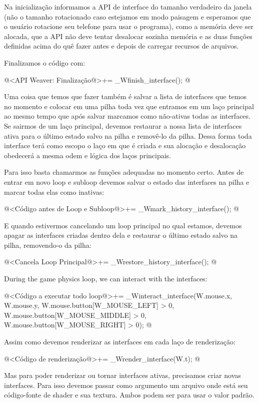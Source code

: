 Na inicialização informamos a API de interface do tamanho verdadeiro
da janela (não o tamanho rotacionado caso estejamos em modo paisagem e
esperamos que o usuário rotacione seu telefone para usar o programa),
como a memória deve ser alocada, que a API não deve tentar desalocar
sozinha memória e as duas funções definidas acima do quê fazer antes e
depois de carregar recursos de arquivos.

Finalizamos o código com:

\iniciocodigo
@<API Weaver: Finalização@>+=
_Wfinish_interface();
@
\fimcodigo

Uma coisa que temos que fazer também é salvar a lista de interfaces
que temos no momento e colocar em uma pilha toda vez que entramos em
um laço principal ao mesmo tempo que após salvar marcamos como
não-ativas todas as interfaces. Se sairmos de um laço principal,
devemos restaurar a nossa lista de interfaces ativa para o último
estado salvo na pilha e removê-lo da pilha. Dessa forma toda interface
terá como escopo o laço em que é criada e sua alocação e desalocação
obedecerá a mesma odem e lógica dos laços principais.

Para isso basta chamarmos as funções adequadas no momento
certo. Antes de entrar em novo loop e subloop devemos salvar o estado
das interfaces na pilha e marcar todas elas como inativas:

\iniciocodigo
@<Código antes de Loop e Subloop@>+=
_Wmark_history_interface();
@
\fimcodigo

E quando estivermos cancelando um loop principal no qual estamos,
devemos apagar as interfaces criadas dentro dela e restaurar o último
estado salvo na pilha, removendo-o da pilha:

\iniciocodigo
@<Cancela Loop Principal@>+=
_Wrestore_history_interface();
@
\fimcodigo

During the game physics loop, we can interact with the interfaces:

\iniciocodigo
@<Código a executar todo loop@>+=
_Winteract_interface(W.mouse.x, W.mouse.y,
                     W.mouse.button[W_MOUSE_LEFT] > 0,
                     W.mouse.button[W_MOUSE_MIDDLE] > 0,
                     W.mouse.button[W_MOUSE_RIGHT] > 0);
@
\fimcodigo

Assim como devemos renderizar as interfaces em cada laço de
renderização:

\iniciocodigo
@<Código de renderização@>+=
_Wrender_interface(W.t);
@
\fimcodigo

Mas para poder renderizar ou tornar interfaces ativas, precisamos
criar novas interfaces. Para isso devemos passar como argumento um
arquivo onde está seu código-fonte de shader e sua textura. Ambos
podem ser  para usar o valor padrão.

